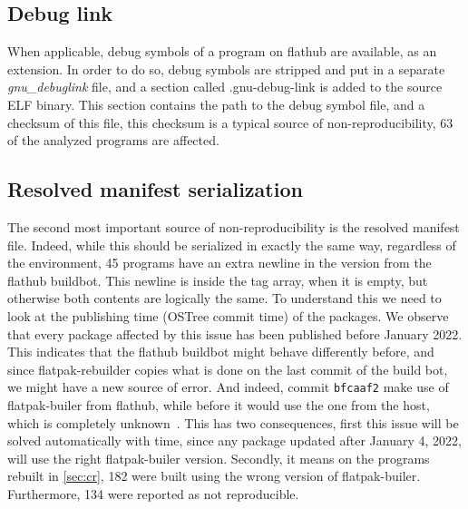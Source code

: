 \documentclass[a4paper,11pt,oneside]{report}
\theoremstyle{definition}
\newcommand{\sysname}{flatpak-rebuilder\xspace}
\newcommand{\fh}{flathub\xspace}
\newcommand{\fb}{flatpak-builer\xspace}
\newcommand{\fhbb}{flathub buildbot\xspace}
\begin{document}
\subsection*{Debug link}
When applicable, debug symbols of a program on \fh are available, as an
extension. In order to do so, debug symbols are stripped and put in a separate
\emph{gnu\_debuglink} file, and a section called .gnu-debug-link is added to the
source ELF binary. This section contains the path to the debug symbol file, and
a checksum of this file, this checksum is a typical source of
non-reproducibility, 63 of the analyzed programs are affected.

\subsection*{Resolved manifest serialization}
The second most important source of non-reproducibility is the resolved
manifest file. Indeed, while this should be serialized in exactly the same way,
regardless of the environment, 45 programs have an extra newline in the version
from the \fhbb. This newline is inside the tag array, when it is empty, but
otherwise both contents are logically the same. To understand this we need to
look at the publishing time (OSTree commit time) of the packages. We observe
that every package affected by this issue has been published before January
2022. This indicates that the \fhbb might behave differently before, and since
\sysname copies what is done on the last commit of the build bot, we might have
a new source of error. And indeed, commit \verb|bfcaaf2| make use of \fb from
\fh, while before it would use the one from the host, which is completely
unknown~\cite{gh:ptdr}. This has two consequences, first this issue will be
solved automatically with time, since any package updated after January 4, 2022,
will use the right \fb version. Secondly, it means on the programs rebuilt in
\autoref{sec:cr}, 182 were built using the wrong version of \fb. Furthermore,
134 were reported as not reproducible.
\end{document}
